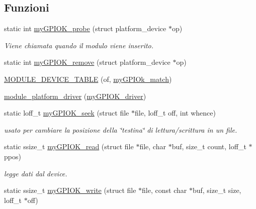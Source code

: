 \subsection*{Funzioni}
\begin{DoxyCompactItemize}
\item 
static int \hyperlink{group___kernel-_module_gae40973a06d72f7c41a9af07513a62307}{my\+G\+P\+I\+O\+K\+\_\+probe} (struct platform\+\_\+device $\ast$op)
\begin{DoxyCompactList}\small\item\em Viene chiamata quando il modulo viene inserito. \end{DoxyCompactList}\item 
static int \hyperlink{group___kernel-_module_ga59fddfaa36dea357f4bbdfceb0f47f8c}{my\+G\+P\+I\+O\+K\+\_\+remove} (struct platform\+\_\+device $\ast$op)
\item 
\hyperlink{group___kernel-_module_ga4982cc224a0881ae5d106fce7526fb68}{M\+O\+D\+U\+L\+E\+\_\+\+D\+E\+V\+I\+C\+E\+\_\+\+T\+A\+B\+L\+E} (of, \hyperlink{group___kernel-_module_ga91f28437e0a553effa546d16fa44f03a}{my\+G\+P\+I\+Ok\+\_\+match})
\item 
\hyperlink{group___kernel-_module_ga61e890be90fe5582db8048893ca0ebbf}{module\+\_\+platform\+\_\+driver} (\hyperlink{group___kernel-_module_ga8dba1541b58fa63f8208232ffce4fc47}{my\+G\+P\+I\+O\+K\+\_\+driver})
\item 
static loff\+\_\+t \hyperlink{group___kernel-_module_gaee309b7824d1efb418d9aa5e8c888c7c}{my\+G\+P\+I\+O\+K\+\_\+seek} (struct file $\ast$file, loff\+\_\+t off, int whence)
\begin{DoxyCompactList}\small\item\em usato per cambiare la posizione della \char`\"{}testina\char`\"{} di lettura/scrittura in un file. \end{DoxyCompactList}\item 
static ssize\+\_\+t \hyperlink{group___kernel-_module_gac03e8e943c9886549d64625253b8c4bf}{my\+G\+P\+I\+O\+K\+\_\+read} (struct file $\ast$file, char $\ast$buf, size\+\_\+t count, loff\+\_\+t $\ast$ppos)
\begin{DoxyCompactList}\small\item\em legge dati dal device. \end{DoxyCompactList}\item 
static ssize\+\_\+t \hyperlink{group___kernel-_module_ga93f7a4111f4555747323e4afcb1343fd}{my\+G\+P\+I\+O\+K\+\_\+write} (struct file $\ast$file, const char $\ast$buf, size\+\_\+t size, loff\+\_\+t $\ast$off)

\end{DoxyCompactItemize}

